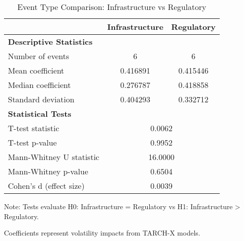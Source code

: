 
\begin{table}[htbp]
\centering
\caption{Event Type Comparison: Infrastructure vs Regulatory}
\label{tab:event_comparison}
\begin{tabular}{lcc}
\hline
\hline
 & Infrastructure & Regulatory \\
\hline
\textbf{Descriptive Statistics} & & \\
Number of events & 6 & 6 \\
Mean coefficient & 0.416891 & 0.415446 \\
Median coefficient & 0.276787 & 0.418858 \\
Standard deviation & 0.404293 & 0.332712 \\
\hline
\textbf{Statistical Tests} & \multicolumn{2}{c}{} \\
T-test statistic & \multicolumn{2}{c}{0.0062} \\
T-test p-value & \multicolumn{2}{c}{0.9952} \\
Mann-Whitney U statistic & \multicolumn{2}{c}{16.0000} \\
Mann-Whitney p-value & \multicolumn{2}{c}{0.6504} \\
Cohen's d (effect size) & \multicolumn{2}{c}{0.0039} \\
\hline
\hline
\end{tabular}
\begin{tablenotes}
\small
\item Note: Tests evaluate H0: Infrastructure = Regulatory vs H1: Infrastructure > Regulatory.
\item Coefficients represent volatility impacts from TARCH-X models.
\end{tablenotes}
\end{table}
